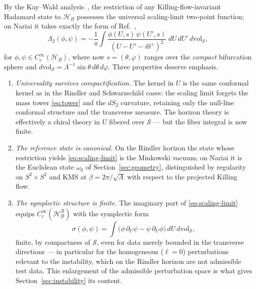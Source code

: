\documentclass[11pt]{article}
\newcommand{\Nariai}{Nariai}
\begin{document}
By the Kay--Wald analysis~\cite{KayWald}, the restriction of any Killing-flow-invariant Hadamard state to $\mathcal{H}_B$ possesses the universal scaling-limit two-point function; on \Nariai{} it takes exactly the form of Ref.~\cite{DorauMuch},
\begin{equation}
\Lambda_2(\phi, \psi)
= -\frac{1}{\pi} \int
\frac{\phi(U, s)\, \psi(U', s)}{(U - U' - i0^+)^2}\;
dU\, dU'\, d\mathrm{vol}_{\mathcal{S}},
\label{eq:scaling-limit}
\end{equation}
for $\phi, \psi \in C^\infty_c(\mathcal{H}_B)$, where now $s = (\theta,\varphi)$ ranges over the \emph{compact} bifurcation sphere and $d\mathrm{vol}_{\mathcal{S}} = \Lambda^{-1} \sin\theta\, d\theta\, d\varphi$. Three properties deserve emphasis.

\begin{enumerate}
\item \emph{Universality survives compactification.} The kernel in $U$ is the same conformal kernel as in the Rindler and Schwarzschild cases: the scaling limit forgets the mass tower \eqref{eq:tower} and the $dS_2$ curvature, retaining only the null-line conformal structure and the transverse measure. The horizon theory is effectively a chiral theory in $U$ fibered over $\mathcal{S}$ --- but the fiber integral is now finite.

\item \emph{The reference state is canonical.} On the Rindler horizon the state whose restriction yields \eqref{eq:scaling-limit} is the Minkowski vacuum; on \Nariai{} it is the Euclidean state $\omega_0$ of Section~\ref{sec:geometry}, distinguished by regularity on $S^2\times S^2$ and KMS at $\beta = 2\pi/\sqrt{\Lambda}$ with respect to the projected Killing flow.

\item \emph{The symplectic structure is finite.} The imaginary part of \eqref{eq:scaling-limit} equips $C^\infty_c(\mathcal{H}_B^{\mathcal{R}})$ with the symplectic form
\begin{equation}
\sigma(\phi,\psi)
= \int \big(\phi\,\partial_U \psi - \psi\,\partial_U \phi\big)\, dU\, d\mathrm{vol}_{\mathcal{S}},
\label{eq:symplectic}
\end{equation}
finite, by compactness of $\mathcal{S}$, even for data merely bounded in the transverse directions --- in particular for the homogeneous ($\ell = 0$) perturbations relevant to the instability, which on the Rindler horizon are not admissible test data. This enlargement of the admissible perturbation space is what gives Section~\ref{sec:instability} its content.

\end{enumerate}
\end{document}
